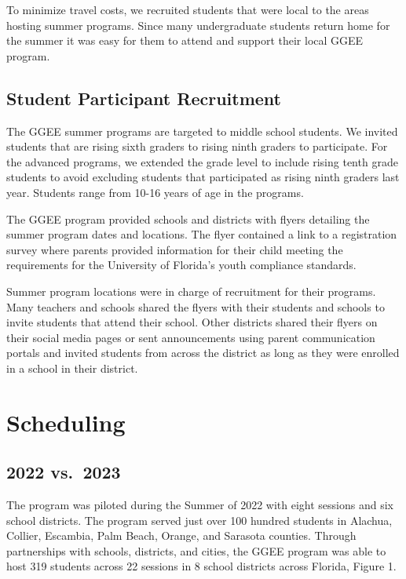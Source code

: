 \documentclass[
]{article}
\begin{document}
To minimize travel costs, we recruited students that were local to the
areas hosting summer programs. Since many undergraduate students return
home for the summer it was easy for them to attend and support their
local GGEE program.

\hypertarget{student-participant-recruitment}{%
\subsection{Student Participant
Recruitment}\label{student-participant-recruitment}}

The GGEE summer programs are targeted to middle school students. We
invited students that are rising sixth graders to rising ninth graders
to participate. For the advanced programs, we extended the grade level
to include rising tenth grade students to avoid excluding students that
participated as rising ninth graders last year. Students range from
10-16 years of age in the programs.

The GGEE program provided schools and districts with flyers detailing
the summer program dates and locations. The flyer contained a link to a
registration survey where parents provided information for their child
meeting the requirements for the University of Florida's youth
compliance standards.

Summer program locations were in charge of recruitment for their
programs. Many teachers and schools shared the flyers with their
students and schools to invite students that attend their school. Other
districts shared their flyers on their social media pages or sent
announcements using parent communication portals and invited students
from across the district as long as they were enrolled in a school in
their district.

\hypertarget{scheduling}{%
\section{Scheduling}\label{scheduling}}

\hypertarget{vs.-2023}{%
\subsection{2022 vs.~2023}\label{vs.-2023}}

The program was piloted during the Summer of 2022 with eight sessions
and six school districts. The program served just over 100 hundred
students in Alachua, Collier, Escambia, Palm Beach, Orange, and Sarasota
counties. Through partnerships with schools, districts, and cities, the
GGEE program was able to host 319 students across 22 sessions in 8
school districts across Florida, Figure 1.
\end{document}
